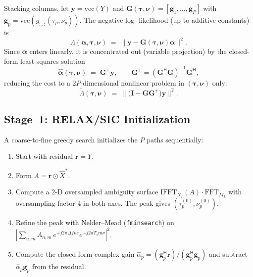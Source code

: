 \documentclass[11pt,a4paper]{article}
\newcommand{\deltaf}{\Delta f}
\begin{document}
Stacking columns, let $\mathbf y = \mathrm{vec}(Y)$ and
$\mathbf G(\bm\tau,\bm\nu) = [\mathbf g_1,\dots,\mathbf g_P]$ with
$\mathbf g_p = \mathrm{vec}(g_{:,:}(\tau_p,\nu_p))$. The negative log-
likelihood (up to additive constants) is
\begin{equation}
  \Lambda(\bm\alpha,\bm\tau,\bm\nu)
  \;=\; \bigl\|\mathbf y - \mathbf G(\bm\tau,\bm\nu)\bm\alpha\bigr\|^{2}.
\end{equation}
Since $\bm\alpha$ enters linearly, it is concentrated out (variable
projection) by the closed-form least-squares solution
\begin{equation}
  \hat{\bm\alpha}(\bm\tau,\bm\nu)
  \;=\; \mathbf G^{+}\mathbf y,
  \qquad
  \mathbf G^{+} = (\mathbf G^{\mathsf H}\mathbf G)^{-1}\mathbf G^{\mathsf H},
\end{equation}
reducing the cost to a $2P$-dimensional nonlinear problem in
$(\bm\tau,\bm\nu)$ only:
\begin{equation}
  \tilde\Lambda(\bm\tau,\bm\nu)
  \;=\; \bigl\|\bigl(\mathbf I - \mathbf G\mathbf G^{+}\bigr)\mathbf y\bigr\|^{2}.
\end{equation}

\subsection{Stage~1: RELAX/SIC Initialization}
A coarse-to-fine greedy search initializes the $P$ paths sequentially:
\begin{enumerate}
  \item Start with residual $\mathbf r = Y$.
  \item Form $A = \mathbf r \odot \hat X^{*}$.
  \item Compute a 2-D oversampled ambiguity surface
        $\mathrm{IFFT}_{N_f}(A)\cdot \mathrm{FFT}_{M_f}$ with
        oversampling factor $4$ in both axes. The peak gives
        $(\tau_p^{(0)},\nu_p^{(0)})$.
  \item Refine the peak with Nelder--Mead
        (\texttt{fminsearch}) on
        $|\sum_{n,m} A_{n,m}\,e^{+j2\pi\deltaf n\tau} e^{-j2\pi T_s m\nu}|^{2}$.
  \item Compute the closed-form complex gain
        $\hat\alpha_p = (\mathbf g_p^{\mathsf H}\mathbf r) /
        (\mathbf g_p^{\mathsf H}\mathbf g_p)$ and subtract
        $\hat\alpha_p \mathbf g_p$ from the residual.
\end{enumerate}
\end{document}
